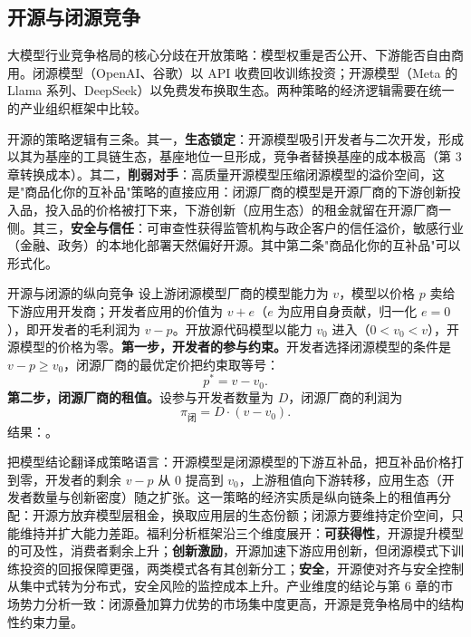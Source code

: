 \subsection{开源与闭源竞争}

大模型行业竞争格局的核心分歧在开放策略：模型权重是否公开、下游能否自由商用。闭源模型（OpenAI、谷歌）以 API 收费回收训练投资；开源模型（Meta 的 Llama 系列、DeepSeek）以免费发布换取生态。两种策略的经济逻辑需要在统一的产业组织框架中比较。

开源的策略逻辑有三条。其一，\textbf{生态锁定}：开源模型吸引开发者与二次开发，形成以其为基座的工具链生态，基座地位一旦形成，竞争者替换基座的成本极高（第 3 章转换成本）。其二，\textbf{削弱对手}：高质量开源模型压缩闭源模型的溢价空间，这是"商品化你的互补品"策略的直接应用：闭源厂商的模型是开源厂商的下游创新投入品，投入品的价格被打下来，下游创新（应用生态）的租金就留在开源厂商一侧。其三，\textbf{安全与信任}：可审查性获得监管机构与政企客户的信任溢价，敏感行业（金融、政务）的本地化部署天然偏好开源。其中第二条"商品化你的互补品"可以形式化。

\begin{derivation}{开源与闭源的纵向竞争}{}
设上游闭源模型厂商的模型能力为 $v$，模型以价格 $p$ 卖给下游应用开发商；开发者应用的价值为 $v + e$（$e$ 为应用自身贡献，归一化 $e=0$），即开发者的毛利润为 $v - p$。开放源代码模型以能力 $v_0$ 进入（$0 < v_0 < v$），开源模型的价格为零。\textbf{第一步，开发者的参与约束。}开发者选择闭源模型的条件是 $v - p \ge v_0$，闭源厂商的最优定价把约束取等号：
\[
p^* = v - v_0.
\]
\textbf{第二步，闭源厂商的租值。}设参与开发者数量为 $D$，闭源厂商的利润为
\[
\pi_{\text{闭}} = D \cdot (v - v_0).
\]
结果：。
\end{derivation}

把模型结论翻译成策略语言：开源模型是闭源模型的下游互补品，把互补品价格打到零，开发者的剩余 $v - p$ 从 $0$ 提高到 $v_0$，上游租值向下游转移，应用生态（开发者数量与创新密度）随之扩张。这一策略的经济实质是纵向链条上的租值再分配：开源方放弃模型层租金，换取应用层的生态份额；闭源方要维持定价空间，只能维持并扩大能力差距。福利分析框架沿三个维度展开：\textbf{可获得性}，开源提升模型的可及性，消费者剩余上升；\textbf{创新激励}，开源加速下游应用创新，但闭源模式下训练投资的回报保障更强，两类模式各有其创新分工；\textbf{安全}，开源使对齐与安全控制从集中式转为分布式，安全风险的监控成本上升。产业维度的结论与第 6 章的市场势力分析一致：闭源叠加算力优势的市场集中度更高，开源是竞争格局中的结构性约束力量。

